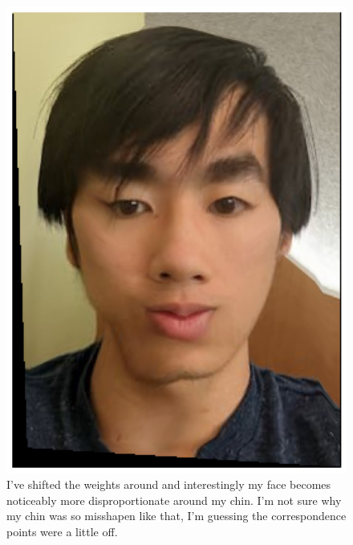 \documentclass{article}
\begin{document}
\begin{figure}[!htb]
    \centering
    \includegraphics[scale=0.5]{im11.png}
    \caption{I've shifted the weights around and interestingly my face becomes noticeably more disproportionate around my chin. I'm not sure why my chin was so misshapen like that, I'm guessing the correspondence points were a little off.}
\end{figure}
\end{document}
